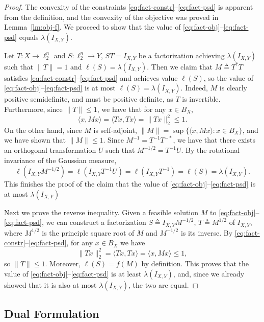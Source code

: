 \documentclass{article}
\newcommand{\eqdef}{\triangleq}
\begin{document}
\begin{proof}
  The convexity of the constraints
  \eqref{eq:fact-constr}--\eqref{eq:fact-psd} is apparent from the
  definition, and the convexity of the objective was proved in
  Lemma~\ref{lm:obj-f}. We proceed to show that the value of
  \eqref{eq:fact-obj}--\eqref{eq:fact-psd} equals $\lambda(I_{X,Y})$.

  Let $T:X \to \ell_2^n$ and $S:\ell_2^n \to Y$, $ST = I_{X,Y}$ be a
  factorization achieving $\lambda(I_{X,Y})$ such that $\|T\| = 1$ and
  $\ell(S) = \lambda(I_{X,Y})$. Then we claim that $M \eqdef T^*T$
  satisfies \eqref{eq:fact-constr}--\eqref{eq:fact-psd} and achieves
  value $\ell(S)$, so the value of
  \eqref{eq:fact-obj}--\eqref{eq:fact-psd} is at most
  $\ell(S) = \lambda(I_{X,Y})$. Indeed, $M$ is clearly positive semidefinite,
  and must be positive definite, as $T$ is
  invertible. Furthermore, since $\|T\|\le 1$, we have that for any $x
  \in B_X$,
  \[\langle x, Mx \rangle = \langle Tx, Tx\rangle =
  \|Tx\|^2_2 \le 1.\] 
  On the other hand, since $M$ is self-adjoint,
  $\|M\| = \sup\{\langle x, Mx\rangle: x \in B_X\}$, and we have shown
  that $\|M\| \le 1$. Since $M^{-1} = T^{-1}T^{-*}$, we have that
  there exists an orthogonal transformation $U$ such that $M^{-1/2} =
  T^{-1}U$. By the rotational invariance of the Gaussian measure, 
  \[
  \ell(I_{X,Y}M^{-1/2}) = 
  \ell(I_{X,Y}  T^{-1}U) = 
  \ell(I_{X,Y}  T^{-1})  = \ell(S) = \lambda(I_{X,Y}).
  \]
  This finishes the proof of the claim that the value of
  \eqref{eq:fact-obj}--\eqref{eq:fact-psd} is at most $\lambda(I_{X,Y})$
  
  Next we prove the reverse inequality. Given a feasible solution $M$
  to \eqref{eq:fact-obj}--\eqref{eq:fact-psd}, we can construct a
  factorization $S \eqdef I_{X,Y}M^{-1/2}$, $T \eqdef M^{1/2}$ of
  $I_{X,Y}$, where $M^{1/2}$ is the principle square root of $M$ and
  $M^{-1/2}$ is its inverse. By
  \eqref{eq:fact-constr}--\eqref{eq:fact-psd}, for any $x \in B_X$ we have
  \[
  \|Tx\|^2_2 = \langle Tx, Tx\rangle = \langle x, Mx \rangle  \le
  1,\] so $\|T\| \le 1$. Moreover, $\ell(S) = f(M)$ by
  definition. This proves that the value of
  \eqref{eq:fact-obj}--\eqref{eq:fact-psd} is at least
  $\lambda(I_{X,Y})$, and, since we already showed that it is also at
  most $\lambda(I_{X,Y})$, the two are equal.
\end{proof}

\subsection{Dual Formulation}
\end{document}
